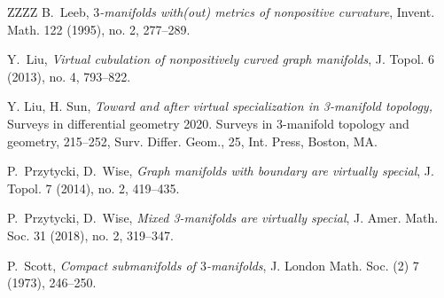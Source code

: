 \documentclass{amsart}
\numberwithin{equation}{section}
\theoremstyle{definition}
\begin{document}
\begin{thebibliography}{ZZZZ}
 {B.~Leeb}, {\it $3$-manifolds with(out) metrics of nonpositive curvature},
Invent. Math. 122 (1995), no. 2, 277--289.


 {Y.~Liu}, {\it Virtual cubulation of nonpositively curved graph manifolds}, 
J. Topol. 6 (2013), no. 4, 793--822.


 Y. Liu, H. Sun, {\it Toward and after virtual specialization in 3-manifold topology,} Surveys in differential geometry 2020. Surveys in 3-manifold topology and geometry, 215--252, Surv. Differ. Geom., 25, Int. Press, Boston, MA.












 {P.~Przytycki, D.~Wise}, {\it Graph manifolds with boundary are virtually special},
J. Topol. 7 (2014), no. 2, 419--435.

 {P.~Przytycki, D.~Wise}, {\it Mixed 3-manifolds are virtually special}, 
J. Amer. Math. Soc. 31 (2018), no. 2, 319--347.

 {P.~Scott}, {\it Compact submanifolds of $3$-manifolds},
J. London Math. Soc. (2) 7 (1973), 246--250.





\end{thebibliography}
\end{document}
